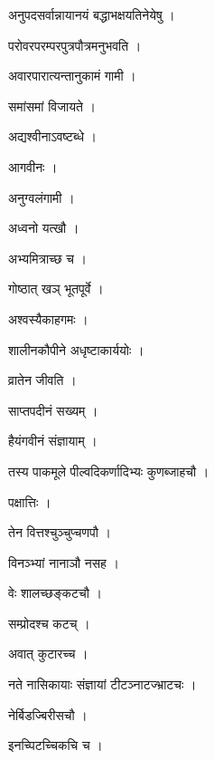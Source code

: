 \documentclass[10pt, openany]{book}
\begin{document}
\noindent अनुपदसर्वान्नायानयं बद्धाभक्षयतिनेयेषु ।

\noindent परोवरपरम्परपुत्रपौत्रमनुभवति ।

\noindent अवारपारात्यन्तानुकामं गामी ।

\noindent समांसमां विजायते ।

\noindent अद्यश्वीनाऽवष्टब्धे ।

\noindent आगवीनः ।

\noindent अनुग्वलंगामी ।

\noindent अध्वनो यत्खौ ।

\noindent अभ्यमित्राच्छ च ।

\noindent गोष्ठात् खञ् भूतपूर्वे ।

\noindent अश्वस्यैकाहगमः ।

\noindent शालीनकौपीने अधृष्टाकार्ययोः ।

\noindent व्रातेन जीवति ।

\noindent साप्तपदीनं सख्यम् ।

\noindent हैयंगवीनं संज्ञायाम् ।

\noindent तस्य पाकमूले पील्वदिकर्णादिभ्यः कुणब्जाहचौ ।

\noindent पक्षात्तिः ।

\noindent तेन वित्तश्चुञ्चुप्चणपौ ।

\noindent विनञ्भ्यां नानाञौ नसह ।

\noindent वेः शालच्छङ्कटचौ ।

\noindent सम्प्रोदश्च कटच् ।

\noindent अवात् कुटारच्च ।

\noindent नते नासिकायाः संज्ञायां टीटञ्नाटज्भ्राटचः ।

\noindent नेर्बिडज्बिरीसचौ ।

\noindent इनच्पिटच्चिकचि च ।
\end{document}
